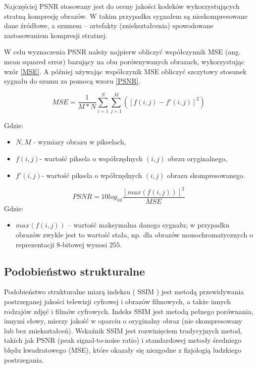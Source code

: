 \documentclass[a4paper,12pt,twoside,openany]{report}
\begin{document}
Najczęściej PSNR stosowany jest do oceny jakości kodeków wykorzystujących stratną kompresję obrazów. W takim przypadku sygnałem są nieskompresowane dane źródłowe, a szumem – artefakty (zniekształcenia) spowodowane zastosowaniem kompresji stratnej.

W celu wyznaczenia PSNR należy najpierw obliczyć współczynnik MSE (ang. mean squared error) bazujący na obu porównywanych obrazach, wykorzystując wzór \ref{MSE}. A później używając współczynik MSE obliczyć szczytowy stosunek sygnału do szumu za pomocą wzoru \ref{PSNR}. 

\begin{equation}
	MSE= \frac{1}{M*N} \sum_{i=1}^{N} \sum_{j=1}^{M} ([f(i,j)-f'(i,j)]^2) \label{MSE}
\end{equation}

Gdzie:
\begin{itemize}
	\item $N,M$ - wymiary obrazu w pikselach,
	\item $f(i,j)$- wartość piksela o współrzędnych $(i,j)$ obrzu oryginalnego,
	\item $f'(i,j)$- wartość piksela o wpółrzędnych $(i,j)$ obrazu skompresowanego.
\end{itemize}

\begin{equation}
	PSNR= 10 log_{10}{\frac{[max(f(i,j))]^2}{MSE}}
	\label{PSNR}
\end{equation}
Gdzie: 
\begin{itemize}
	\item $max(f(i,j))$ – wartość maksymalna danego sygnału; w przypadku obrazów zwykle jest to wartość stała, np. dla obrazów monochromatycznych o reprezentacji 8-bitowej wynosi $255$.
\end{itemize}

\subsection{Podobieństwo strukturalne}
Podobieństwo strukturalne miarą indeksu ( SSIM ) jest metodą przewidywania postrzeganej jakości telewizji cyfrowej i obrazów filmowych, a także innych rodzajów zdjęć i filmów cyfrowych. Indeks SSIM jest metodą pełnego porównania, innymi słowy, mierzy jakość w oparciu o oryginalny obraz (nie skompresowany lub bez zniekształceń). Wskaźnik SSIM jest rozwinięciem tradycyjnych metod, takich jak PSNR (peak signal-to-noise ratio) i standardowej metody średniego błędu kwadratowego (MSE), które okazały się niezgodne z fizjologią ludzkiego postrzegania. 
\end{document}
